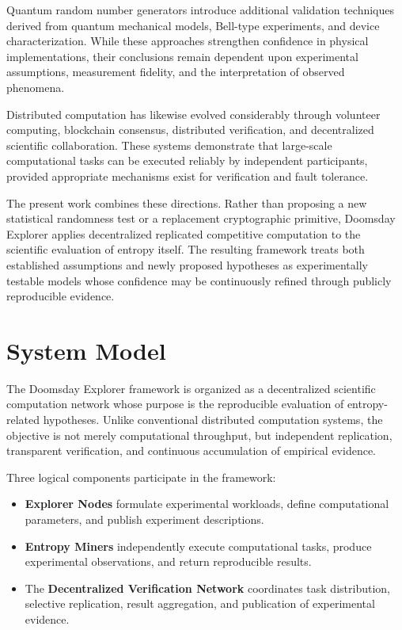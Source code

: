 \documentclass[11pt]{article}
\begin{document}
Quantum random number generators introduce additional
validation techniques derived from quantum mechanical models,
Bell-type experiments,
and device characterization.
While these approaches strengthen confidence in physical implementations,
their conclusions remain dependent upon
experimental assumptions,
measurement fidelity,
and the interpretation of observed phenomena.

Distributed computation has likewise evolved considerably through
volunteer computing,
blockchain consensus,
distributed verification,
and decentralized scientific collaboration.
These systems demonstrate that large-scale computational tasks
can be executed reliably by independent participants,
provided appropriate mechanisms exist
for verification and fault tolerance.

The present work combines these directions.
Rather than proposing a new statistical randomness test
or a replacement cryptographic primitive,
Doomsday Explorer applies decentralized replicated competitive computation
to the scientific evaluation of entropy itself.
The resulting framework treats both established assumptions
and newly proposed hypotheses
as experimentally testable models whose confidence
may be continuously refined through publicly reproducible evidence.



\section{System Model}

The Doomsday Explorer framework is organized as a decentralized
scientific computation network whose purpose is the reproducible
evaluation of entropy-related hypotheses.
Unlike conventional distributed computation systems,
the objective is not merely computational throughput,
but independent replication,
transparent verification,
and continuous accumulation of empirical evidence.

Three logical components participate in the framework:

\begin{itemize}

\item
\textbf{Explorer Nodes}
formulate experimental workloads,
define computational parameters,
and publish experiment descriptions.

\item
\textbf{Entropy Miners}
independently execute computational tasks,
produce experimental observations,
and return reproducible results.

\item
The
\textbf{Decentralized Verification Network}
coordinates task distribution,
selective replication,
result aggregation,
and publication of experimental evidence.

\end{itemize}
\end{document}
